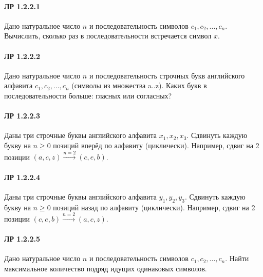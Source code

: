 \documentclass[12pt,a4paper]{report}
\begin{document}
\paragraph*{ЛР 1.2.2.1} Дано натуральное число $n$ и последовательность символов $c_1, c_2, ..., c_n$. Вычислить, сколько раз в последовательности встречается символ $x$.
\paragraph*{ЛР 1.2.2.2} Дано натуральное число $n$ и последовательность строчных букв английского алфавита $c_1, c_2, ..., c_n$ (символы из множества a..z). Каких букв в последовательности больше: гласных или согласных?
\paragraph*{ЛР 1.2.2.3} Даны три строчные буквы английского алфавита $x_1, x_2, x_3 $. Сдвинуть каждую букву на $n \ge 0$ позиций вперёд по алфавиту (циклически). Например, сдвиг на 2 позиции $(a, c, z) \xrightarrow{n=2} (c, e, b)$.
\paragraph*{ЛР 1.2.2.4} Даны три строчные буквы английского алфавита $y_1, y_2, y_3 $. Сдвинуть каждую букву на $n \ge 0$ позиций назад по алфавиту (циклически). Например, сдвиг на 2 позиции $(c, e, b) \xrightarrow{n=2} (a, c, z)$.
\paragraph*{ЛР 1.2.2.5} Дано натуральное число $n$ и последовательность символов $c_1, c_2, ..., c_n$. Найти максимальное количество подряд идущих одинаковых символов.
\end{document}
